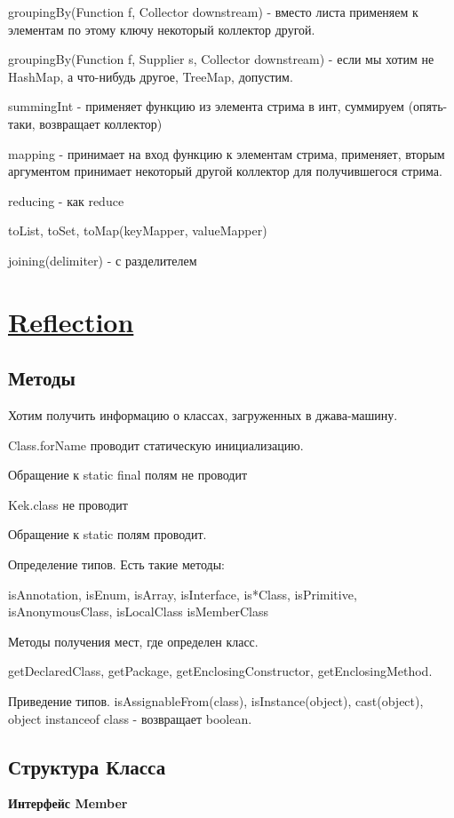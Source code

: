 \documentclass{article}
\begin{document}
groupingBy(Function f, Collector downstream) - вместо листа применяем к элементам по этому ключу некоторый коллектор другой.

groupingBy(Function f, Supplier s, Collector downstream) - если мы хотим не HashMap, а что-нибудь другое, TreeMap, допустим.

summingInt - применяет функцию из элемента стрима в инт, суммируем (опять-таки, возвращает коллектор)

mapping - принимает на вход функцию к элементам стрима, применяет, вторым аргументом принимает некоторый другой коллектор для получившегося стрима.

reducing - как reduce

toList, toSet, toMap(keyMapper, valueMapper)

joining(delimiter) - с разделителем

\section{\underline{Reflection}}

\subsection{Методы}

Хотим получить информацию о классах, загруженных в джава-машину.

Class.forName проводит статическую инициализацию.

Обращение к static final полям не проводит

Kek.class не проводит

Обращение к static полям проводит.

Определение типов. Есть такие методы: 

isAnnotation, isEnum, isArray, isInterface, is*Class, isPrimitive, isAnonymousClass, isLocalClass isMemberClass

Методы получения мест, где определен класс.

getDeclaredClass, getPackage, getEnclosingConstructor, getEnclosingMethod.

Приведение типов. isAssignableFrom(class), isInstance(object), cast(object), object instanceof class - возвращает boolean.

\subsection{Структура Класса}

\textbf{Интерфейс Member}
\end{document}
